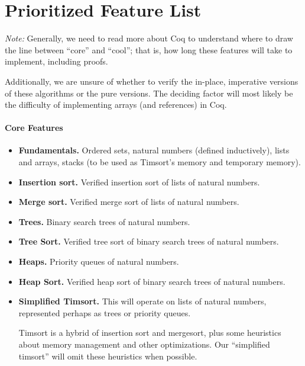 \documentclass{article}
\begin{document}


\section{Prioritized Feature List}
\emph{Note:} Generally, we need to read more about Coq to understand
where to draw the line between ``core'' and ``cool''; that is, how long
these features will take to implement, including proofs.

Additionally, we are unsure of whether to verify the in-place,
imperative versions of these algorithms or the pure versions.
The deciding factor will most likely be the difficulty of implementing
arrays (and references) in Coq.

\paragraph{Core Features}
\begin{itemize}
  \item \textbf{Fundamentals.}
    Ordered sets, natural numbers (defined inductively), lists and arrays,
    stacks (to be used as Timsort's memory and temporary memory).
  \item \textbf{Insertion sort.}
    Verified insertion sort of lists of natural numbers.
  \item \textbf{Merge sort.}
    Verified merge sort of lists of natural numbers.
  \item \textbf{Trees.}
    Binary search trees of natural numbers.
  \item \textbf{Tree Sort.}
    Verified tree sort of
    binary search trees of natural numbers.
  \item \textbf{Heaps.}
    Priority queues of natural numbers.
  \item \textbf{Heap Sort.}
    Verified heap sort of
    binary search trees of natural numbers.
  \item \textbf{Simplified Timsort.}
    This will operate on lists of natural numbers, represented perhaps
    as trees or priority queues.

    Timsort is a hybrid of insertion sort and mergesort, plus some heuristics
    about memory management and other optimizations. Our ``simplified
    timsort'' will omit these heuristics when possible.
\end{itemize}
\end{document}

